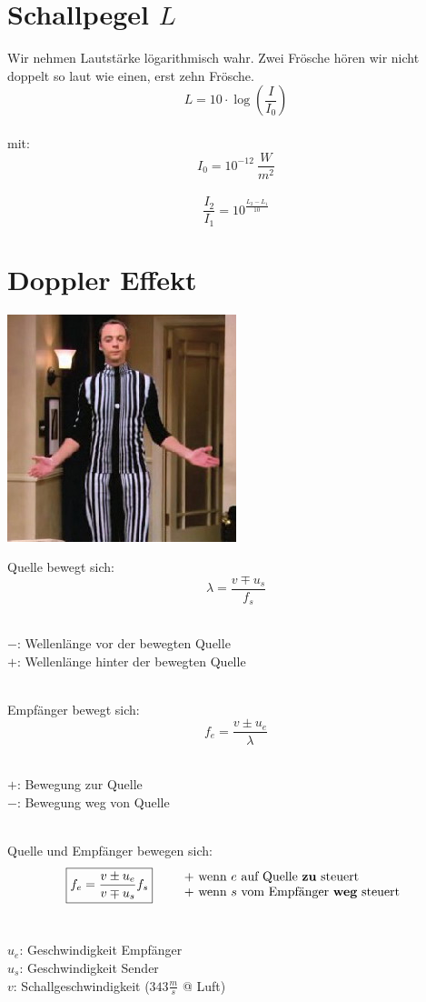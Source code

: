 \section{Schallpegel $L$}
Wir nehmen Lautstärke lögarithmisch wahr. Zwei Frösche hören wir nicht doppelt so laut wie einen, erst zehn Frösche.
\[\boxed{
	L = 10 \cdot \log \left( \frac{I}{I_0} \right)
}\]
\\
mit:
\[
	I_0 = 10^{-12}\ \frac{W}{m^2}
\]
\\
\[\boxed{
	\frac{I_2}{I_1} = 10^{\frac{L_2 - L_1}{10}}
}\]



\section{Doppler Effekt}
\begin{center}
	\includegraphics[scale=0.4]{dopplereffect.png}
\end{center}
Quelle bewegt sich:
\[
	\lambda = \frac{v\mp u_s}{f_s}
\]\\
\begin{footnotesize}
	$-$: Wellenlänge vor der bewegten Quelle\\
	$+$: Wellenlänge hinter der bewegten Quelle\\
\end{footnotesize}
\\
Empfänger bewegt sich:
\[
	f_e = \frac{v \pm u_e}{\lambda}
\]\\
\begin{footnotesize}
	$+$: Bewegung zur Quelle\\
	$-$: Bewegung weg von Quelle\\
\end{footnotesize}
\\
Quelle und Empfänger bewegen sich:
\[\boxed{
	f_e = \frac{v \pm u_e}{v \mp u_s}f_s
} \qquad
	\begin{array}{l}
	+ \text{ wenn $e$ auf Quelle \textbf{zu} steuert} \\ 
	+ \text{ wenn $s$ vom Empfänger \textbf{weg} steuert}
	\end{array} 
\]
\\
\begin{footnotesize}
	$u_e$: Geschwindigkeit Empfänger\\
	$u_s$: Geschwindigkeit Sender\\
	$v$: Schallgeschwindigkeit ($343\frac{m}{s}$ @ Luft)
\end{footnotesize}



